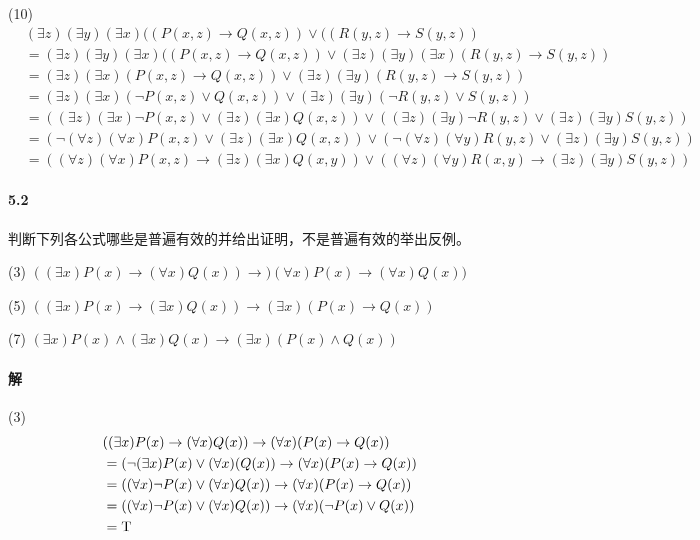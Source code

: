\documentclass[hyperref, UTF8]{ctexart}
\newcommand{\true}{{\rm T}}
\begin{document}
(10)
\begin{align*}
& ( \exists z) ( \exists y) ( \exists x)((P(x,z) \rightarrow Q(x,z)) \lor ((R(y,z) \rightarrow S(y,z)) 
\\ & = ( \exists z) ( \exists y) ( \exists x)((P(x,z) \rightarrow Q(x,z)) \lor ( \exists z) ( \exists y) ( \exists x)(R(y,z) \rightarrow S(y,z))
\\ & = ( \exists z) ( \exists x)(P(x,z) \rightarrow Q(x,z)) \lor ( \exists z) ( \exists y)(R(y,z) \rightarrow S(y,z))
\\ & = ( \exists z) ( \exists x)(\lnot P(x,z) \lor Q(x,z)) \lor ( \exists z) ( \exists y)(\lnot R(y,z) \lor S(y,z)) 
\\ & = ( ( \exists z) ( \exists x) \lnot P(x,z) \lor ( \exists z) ( \exists x) Q(x,z)) \lor ( ( \exists z) ( \exists y) \lnot R(y,z) \lor ( \exists z) ( \exists y)S(y,z))
\\ & = (\lnot ( \forall z) ( \forall x)P(x,z) \lor ( \exists z) ( \exists x)Q(x,z)) \lor (\lnot ( \forall z) ( \forall y) R(y,z) \lor ( \exists z) ( \exists y)S(y,z))
\\ & = ( ( \forall z) ( \forall x)P(x,z) \rightarrow ( \exists z) ( \exists x)Q(x,y)) \lor ( ( \forall z) ( \forall y)R(x,y) \rightarrow ( \exists z) ( \exists y)S(y,z))
\end{align*}

\paragraph{5.2}\label{5.2}
判断下列各公式哪些是普遍有效的并给出证明，不是普遍有效的举出反例。

(3) $( ( \exists x)P(x) \rightarrow ( \forall x)Q(x)) \rightarrow )(\forall x)P(x) \rightarrow ( \forall x)Q(x)) $

(5) $ ( ( \exists x)P(x) \rightarrow ( \exists x)Q(x)) \rightarrow (\exists x)(P(x) \rightarrow Q(x)) $

(7) $ ( \exists x)P(x) \land ( \exists x)Q(x) \rightarrow ( \exists x)(P(x) \land Q(x)) $

\paragraph{解}
(3)
\begin{align*}
& ( ( \exists x)P(x) \rightarrow ( \forall x)Q(x)) \rightarrow ( \forall x)(P(x) \rightarrow Q(x))
\\ &= (\lnot ( \exists x)P(x) \lor ( \forall x)(Q(x)) \rightarrow ( \forall x)(P(x) \rightarrow Q(x))
\\ &= ( ( \forall x) \lnot P(x) \lor ( \forall x)Q(x)) \rightarrow ( \forall x)(P(x) \rightarrow Q(x))
\\ &= ( ( \forall x) \lnot P(x) \lor ( \forall x)Q(x)) \rightarrow ( \forall x)(\lnot P(x) \lor Q(x))
\\ &= \true
\end{align*}
\end{document}
